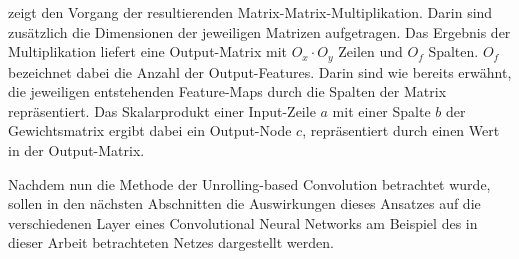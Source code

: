 \documentclass[../main.tex]{subfiles}
\begin{document}
 zeigt den Vorgang der resultierenden Matrix-Matrix-Multiplikation. Darin sind zusätzlich die Dimensionen der jeweiligen Matrizen aufgetragen. Das Ergebnis der Multiplikation liefert eine Output-Matrix mit $O_x \cdot O_y$ Zeilen und $O_f$ Spalten. $O_f$ bezeichnet dabei die Anzahl der Output-Features. Darin sind wie bereits erwähnt, die jeweiligen entstehenden Feature-Maps durch die Spalten der Matrix repräsentiert. Das Skalarprodukt einer Input-Zeile $a$ mit einer Spalte $b$ der Gewichtsmatrix ergibt dabei ein Output-Node $c$, repräsentiert durch einen Wert in der Output-Matrix. \par 
Nachdem nun die Methode der Unrolling-based Convolution betrachtet wurde, sollen in den nächsten Abschnitten die Auswirkungen dieses Ansatzes auf die verschiedenen Layer eines Convolutional Neural Networks am Beispiel des in dieser Arbeit betrachteten Netzes dargestellt werden. \par 
\end{document}
